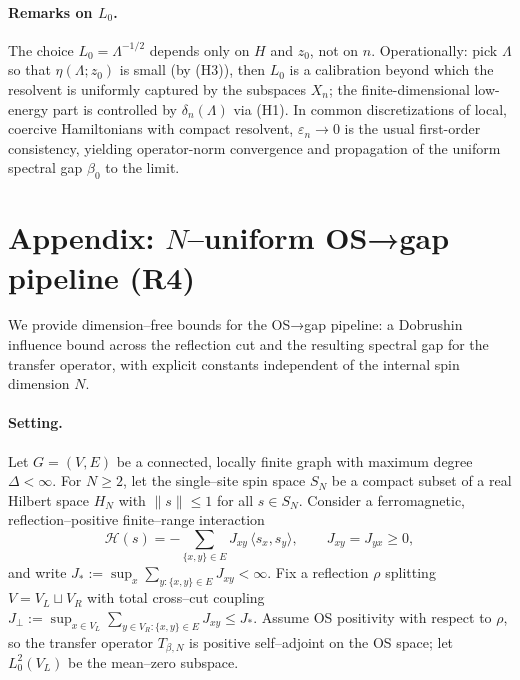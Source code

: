 \documentclass[11pt]{amsart}
\theoremstyle{plain}
\theoremstyle{definition}
\theoremstyle{remark}
\begin{document}
\paragraph{Remarks on $L_0$.}
The choice $L_0=\Lambda^{-1/2}$ depends only on $H$ and $z_0$, not on $n$. Operationally: pick $\Lambda$ so that $\eta(\Lambda;z_0)$ is small (by (H3)), then $L_0$ is a calibration beyond which the resolvent is uniformly captured by the subspaces $X_n$; the finite-dimensional low-energy part is controlled by $\delta_n(\Lambda)$ via (H1). In common discretizations of local, coercive Hamiltonians with compact resolvent, $\varepsilon_n\to 0$ is the usual first-order consistency, yielding operator-norm convergence and propagation of the uniform spectral gap $\beta_0$ to the limit.

\section{Appendix: $N$–uniform OS→gap pipeline (R4)}

We provide dimension–free bounds for the OS→gap pipeline: a Dobrushin influence bound across the reflection cut and the resulting spectral gap for the transfer operator, with explicit constants independent of the internal spin dimension $N$.

\paragraph{Setting.}
Let $G=(V,E)$ be a connected, locally finite graph with maximum degree $\Delta<\infty$. For $N\ge 2$, let the single–site spin space $S_N$ be a compact subset of a real Hilbert space $H_N$ with $\|s\|\le 1$ for all $s\in S_N$. Consider a ferromagnetic, reflection–positive finite–range interaction
\[
  \mathcal{H}(s)= -\sum_{\{x,y\}\in E} J_{xy}\,\langle s_x,s_y\rangle,\qquad J_{xy}=J_{yx}\ge 0,
\]
and write $J_{\!*}:=\sup_x \sum_{y:\{x,y\}\in E} J_{xy}<\infty$. Fix a reflection $\rho$ splitting $V=V_L\sqcup V_R$ with total cross–cut coupling $J_{\perp}:=\sup_{x\in V_L}\sum_{y\in V_R:\{x,y\}\in E} J_{xy}\le J_{\!*}$. Assume OS positivity with respect to $\rho$, so the transfer operator $T_{\beta,N}$ is positive self–adjoint on the OS space; let $L^2_0(V_L)$ be the mean–zero subspace.
\end{document}

